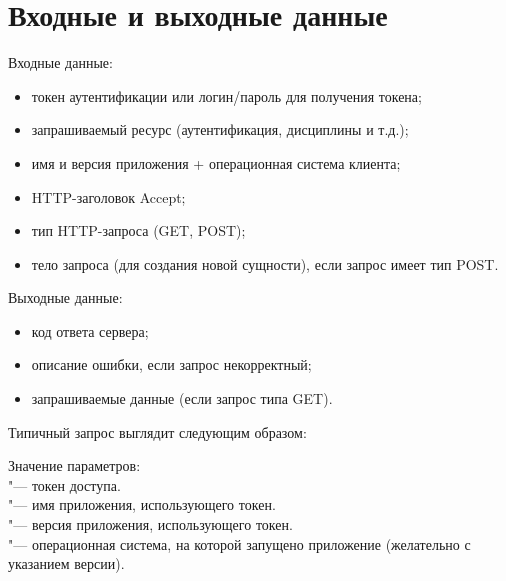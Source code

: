 \chapter{Входные и выходные данные}
\label{ch:io}

Входные данные:
\begin{itemize}
  \item токен аутентификации или логин/пароль для получения токена;
  \item запрашиваемый ресурс (аутентификация, дисциплины и т.д.);
  \item имя и версия приложения + операционная система клиента;
  \item HTTP-заголовок Accept;
  \item тип HTTP-запроса (GET, POST);
  \item тело запроса (для создания новой сущности), если запрос имеет тип POST\@.
\end{itemize}

Выходные данные:
\begin{itemize}
  \item код ответа сервера;
  \item описание ошибки, если запрос некорректный;
  \item запрашиваемые данные (если запрос типа GET).
\end{itemize}

Типичный запрос выглядит следующим образом:
\begin{listing}[H]
\end{listing}
\vspace{-0.75cm}

Значение параметров:\\
 "--- токен доступа.\\
 "--- имя приложения, использующего токен.\\
 "--- версия приложения, использующего токен.\\
 "--- операционная система, на которой запущено приложение (желательно с указанием версии).
